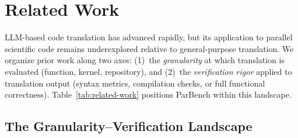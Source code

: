 \documentclass{article}
\begin{document}
\section{Related Work}
\label{sec:related-work}

LLM-based code translation has advanced rapidly, but its application to parallel scientific code remains underexplored relative to general-purpose translation. We organize prior work along two axes: (1)~the \emph{granularity} at which translation is evaluated (function, kernel, repository), and (2)~the \emph{verification rigor} applied to translation output (syntax metrics, compilation checks, or full functional correctness). Table~\ref{tab:related-work} positions ParBench within this landscape.

\subsection{The Granularity--Verification Landscape}
\label{sec:granularity-verification}
\end{document}

